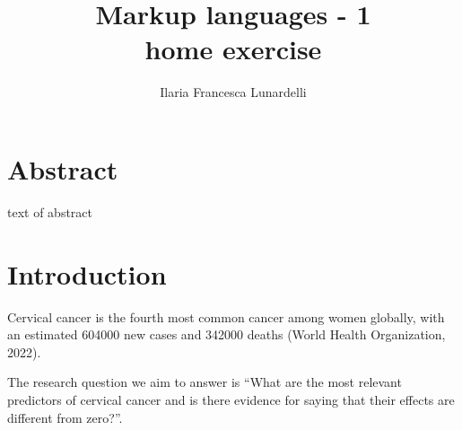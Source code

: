 \documentclass[10pt, fullpage, a4paper, titlepage]{article}
\title{Markup languages - 1\\ \First home exercise}
\author{Ilaria Francesca Lunardelli }
\date{}
\begin{document}
\maketitle

\newpage
 \section*{Abstract}
    text of abstract
    
\section{Introduction}
Cervical cancer is the fourth most common cancer among women globally, with an estimated 604000 new cases and 342000 deaths (World Health Organization, 2022). 

The research question we aim to answer is “What are the most relevant predictors of cervical cancer and is there evidence for saying that their effects are different from zero?”.
\end{document}
